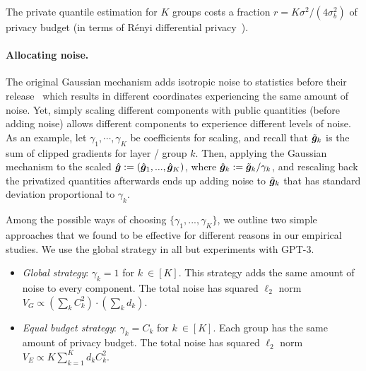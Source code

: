 \begin{Remark}
The private quantile estimation for $K$ groups costs a fraction $r = K\sigma^2/(4\sigma_b^2)$ of privacy budget (in terms of R\'enyi differential privacy~\citep{mironov2017renyi}). 
\end{Remark}

\paragraph{Allocating noise.}
The original Gaussian mechanism adds isotropic noise to statistics before their release~\citep{dwork2014algorithmic} which results in different coordinates experiencing the same amount of noise.
Yet, simply scaling different components with public quantities (before adding noise) allows different components to experience different levels of noise. 
As an example, let $\gamma_1, \cdots, \gamma_K$ be coefficients for scaling, and recall that $\tilde{\bm{g}}_k$ is the sum of clipped gradients for layer / group $k$. 
Then, applying the Gaussian mechanism to the scaled $\hat{\bm{g}} := (\hat{\bm{g}}_1, ..., \hat{\bm{g}}_K)$, where $\hat{\bm{g}}_k:={\tilde{\bm{g}}_k}/{\gamma_k}$, and rescaling back the privatized quantities afterwards ends up adding noise to $\tilde{\bm{g}}_k$ that has standard deviation proportional to $\gamma_k$.

Among the possible ways of choosing $\{\gamma_1, ..., \gamma_K\}$, we outline two simple approaches that we found to be effective for different reasons in our empirical studies. We use the global strategy in all but experiments with GPT-3.
\begin{itemize}[leftmargin=6mm,noitemsep]
    \item \emph{Global strategy}: $\gamma_k = 1$ for $k\ \in [K]$. This strategy adds the same amount of noise to every component.  The total noise has squared $\ell_2$ norm $V_{G}\propto(\sum_{k}C_k^{2})\cdot(\sum_{k}d_{k})$.

    \item \emph{Equal budget strategy}: $\gamma_k = C_k$ for $k\ \in [K]$. Each group has the same amount of privacy budget.  The total noise has squared $\ell_2$ norm $V_{E}\propto K\sum_{k=1}^{K}d_{k}C_k^{2}$.
\end{itemize}


